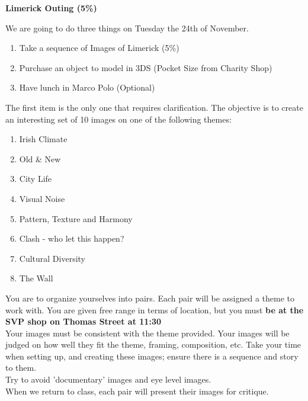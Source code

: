 
	
\begin{flushleft}
\Large\textbf{Limerick Outing (5\%)}\\
\end{flushleft}

We are going to do three things on Tuesday the 24th of November.

\begin{enumerate}
	\item Take a sequence of Images of Limerick (5\%)
	\item Purchase an object to model in 3DS (Pocket Size from Charity Shop)
	\item Have lunch in Marco Polo (Optional)
\end{enumerate}

The first item is the only one that requires clarification.  The objective is to create an interesting set of 10 images on one of the following themes:

\begin{enumerate}
	\item Irish Climate
	\item Old \& New
	\item City Life
	\item Visual Noise
	\item Pattern, Texture and Harmony
	\item Clash - who let this happen?
	\item Cultural Diversity
	\item The Wall
\end{enumerate}

You are to organize yourselves into pairs.  Each pair will be assigned a theme to work with.  You are given free range in terms of location, but you must \textbf{be at the SVP shop on Thomas Street at 11:30}\\

Your images must be consistent with the theme provided.  Your images will be judged on how well they fit the theme, framing, composition, etc.  Take your time when setting up, and creating these images; ensure there is a sequence and story to them.\\

Try to avoid 'documentary' images and eye level images.\\

When we return to class, each pair will present their images for critique.


